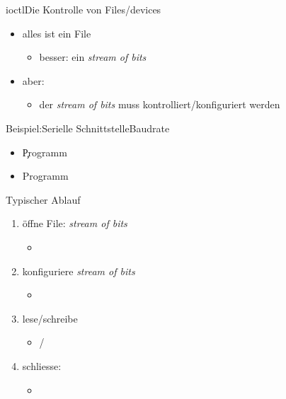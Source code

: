 \begin{frame}{ioctl}{Die Kontrolle von Files/devices}
 \begin{itemize}
  \item alles ist ein File
  \begin{itemize}
   \item besser: ein {\em stream of bits}
  \end{itemize}
  \item aber:
  \begin{itemize}
   \item der {\em stream of bits} muss kontrolliert/konfiguriert werden
  \end{itemize}
 \end{itemize}
\end{frame}

\begin{frame}{Beispiel:Serielle Schnittstelle}{Baudrate}
 \begin{itemize}
  \item {} \c Programm
  \item {} \cpp Programm
 \end{itemize}
\end{frame}

\begin{frame}{Typischer Ablauf}
 \begin{enumerate}
  \item öffne File: {\em stream of bits}  
  \begin{itemize}
   \item {}
  \end{itemize}
  \item konfiguriere {\em stream of bits}
  \begin{itemize}
   \item {}
  \end{itemize}
  \item lese/schreibe
  \begin{itemize}
   \item {}/
  \end{itemize}
  \item schliesse:
  \begin{itemize}
   \item {}
  \end{itemize}
 \end{enumerate}
\end{frame}

